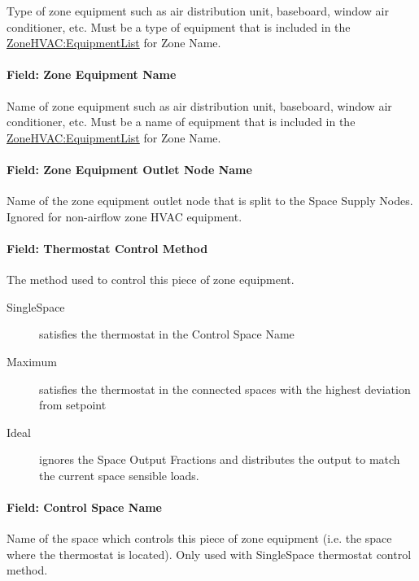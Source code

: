 Type of zone equipment such as air distribution unit, baseboard, window air conditioner, etc. Must be a type of equipment
that is included in the \hyperref[zonehvacequipmentlist]{ZoneHVAC:EquipmentList} for Zone Name.

\paragraph{Field: Zone Equipment Name}\label{field-seqsplitter-zone-equipment-name}

Name of zone equipment such as air distribution unit, baseboard, window air conditioner, etc. Must be a name of equipment
that is included in the \hyperref[zonehvacequipmentlist]{ZoneHVAC:EquipmentList} for Zone Name.

\paragraph{Field: Zone Equipment Outlet Node Name}\label{field-seqsplitter-zone-equipment-outlet-node-name}

Name of the zone equipment outlet node that is split to the Space Supply Nodes. Ignored for non-airflow zone HVAC equipment.

\paragraph{Field: Thermostat Control Method}\label{field-seqsplitter-thermostat-control-method}

The method used to control this piece of zone equipment.

\begin{description}
       \item[SingleSpace] satisfies the thermostat in the Control Space Name
       \item[Maximum] satisfies the thermostat in the connected spaces with the highest deviation from setpoint
       \item[Ideal] ignores the Space Output Fractions and distributes the output to match the current space sensible loads.
\end{description}
 
\paragraph{Field: Control Space Name}\label{field-seqsplitter-control-space-name}

Name of the space which controls this piece of zone equipment (i.e. the space where the thermostat is located). Only used with SingleSpace thermostat control method.

